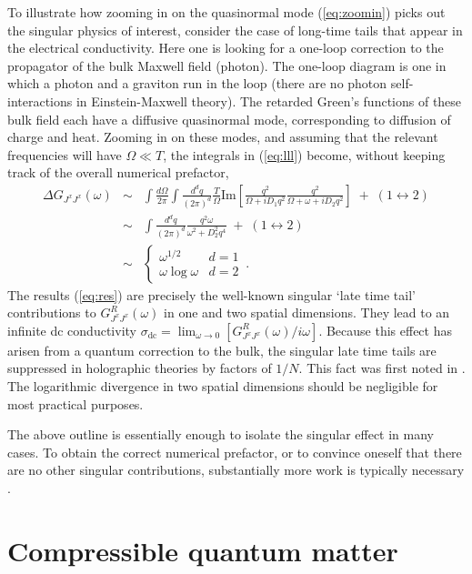 \documentclass[10pt, oneside]{book}
\newcommand{\bea}{\begin{eqnarray}}
\newcommand{\eea}{\end{eqnarray}}
\begin{document}
\begin{doublespace}
To illustrate how zooming in on the quasinormal mode (\ref{eq:zoomin}) picks out the singular physics of interest, consider the case of long-time tails that appear in the electrical conductivity. Here one is looking for a one-loop correction to the propagator of the bulk Maxwell field (photon). The one-loop diagram is one in which a photon and a graviton run in the loop (there are no photon self-interactions in Einstein-Maxwell theory). The retarded Green's functions of these bulk field each have a diffusive quasinormal mode, corresponding to diffusion of charge and heat. Zooming in on these modes, and assuming that the relevant frequencies will have $\Omega \ll T$, the integrals in (\ref{eq:lll}) become, without keeping track of the overall numerical prefactor,
\bea
\Delta G_{J^x J^x}(\omega) & \sim & \int \frac{d\Omega}{2 \pi} \int \frac{d^dq}{(2\pi)^d} \frac{T}{\Omega} \text{Im}\left[ \frac{q^2}{\Omega + i D_1 q^2} \frac{q^2}{\Omega  + \omega + i D_2 q^2}  \right] \; + \; (1 \leftrightarrow 2) \\
& \sim & \int \frac{d^dq}{(2\pi)^d} \frac{q^2 \omega}{\omega^2 + D_2^2 q^4} \; + \; (1 \leftrightarrow 2) \\
& \sim & \left\{
\begin{array}{cc}
\omega^{1/2} & d=1 \\
\omega \log \omega & d=2
\end{array}
\right. \,. \label{eq:res}
\eea
The results (\ref{eq:res}) are precisely the well-known singular `late time tail' contributions to $G^R_{J^x J^x}(\omega)$ in one and two spatial dimensions. They lead to an infinite dc conductivity $\sigma_\text{dc} = \lim_{\omega \to 0} [G^R_{J^x J^x}(\omega)/i \omega]$. Because this effect has arisen from a quantum correction to the bulk, the singular late time tails are suppressed in holographic theories by factors of $1/N$. This fact was first noted in \cite{Kovtun:2003vj}. The logarithmic divergence in two spatial dimensions should be negligible for most practical purposes.

The above outline is essentially enough to isolate the singular effect in many cases. To obtain the correct numerical prefactor, or to convince oneself that there are no other singular contributions, substantially more work is typically necessary \cite{caronhuot, Hartman:2010fk, Anninos:2010sq, Faulkner:2013bna}.



\section{Compressible quantum matter}
\label{sec:compressible}


\end{doublespace}
\end{document}
